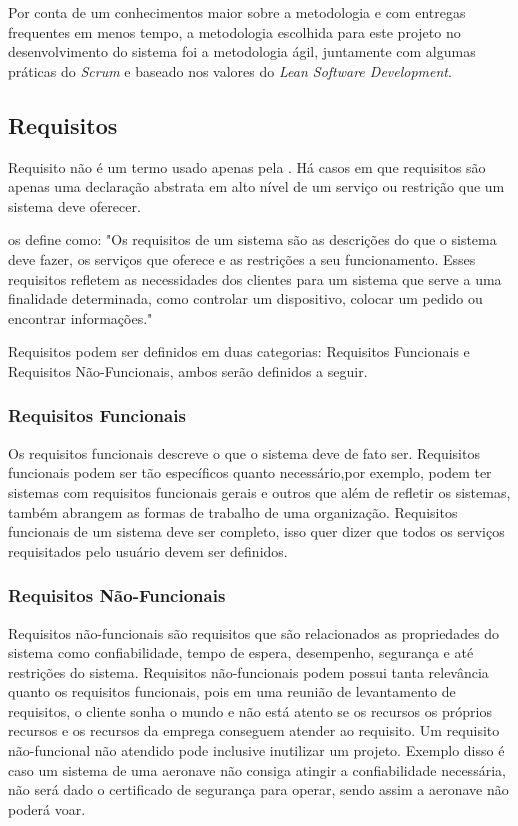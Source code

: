 Por conta de um conhecimentos maior sobre a metodologia e com entregas frequentes em menos tempo, a metodologia escolhida para este projeto no desenvolvimento do sistema foi a metodologia ágil, juntamente com algumas práticas do \textit{Scrum} e baseado nos valores do \textit{Lean Software Development}.

\subsection{Requisitos}
\label{sec:requisitos_introducao}

Requisito não é um termo usado apenas pela \imprimircurso. Há casos em que requisitos são apenas uma declaração abstrata em alto nível de um serviço ou restrição que um sistema deve oferecer.

\cite{sommerville} os define como: "Os requisitos de um sistema são as descrições do que o sistema deve fazer, os serviços que oferece e as restrições a seu funcionamento. Esses requisitos refletem as necessidades dos clientes para um sistema que serve a uma finalidade determinada, como controlar um dispositivo, colocar um pedido ou encontrar informações."

Requisitos podem ser definidos em duas categorias: Requisitos Funcionais e Requisitos Não-Funcionais, ambos serão definidos a seguir.

\subsubsection{Requisitos Funcionais}
\label{sec:requisitos_funcionais_introducao}

Os requisitos funcionais descreve o que o sistema deve de fato ser. Requisitos funcionais podem ser tão específicos quanto necessário,por exemplo, podem ter sistemas com requisitos funcionais gerais e outros que além de refletir os sistemas, também abrangem as formas de trabalho de uma organização. Requisitos funcionais de um sistema deve ser completo, isso quer dizer que todos os serviços requisitados pelo usuário devem ser definidos.

\subsubsection{Requisitos Não-Funcionais}
\label{sec:requisitos_nao_funcionais_introducao}

Requisitos não-funcionais são requisitos que são relacionados as propriedades do sistema como confiabilidade, tempo de espera, desempenho, segurança e até restrições do sistema. Requisitos não-funcionais podem possui tanta relevância quanto os requisitos funcionais, pois em uma reunião de levantamento de requisitos, o cliente sonha o mundo e não está atento se os recursos os próprios recursos e os recursos da emprega conseguem atender ao requisito. Um requisito não-funcional não atendido pode inclusive inutilizar um projeto. Exemplo disso é caso um sistema de uma aeronave não consiga atingir a confiabilidade necessária, não será dado o certificado de segurança para operar, sendo assim a aeronave não poderá voar.

